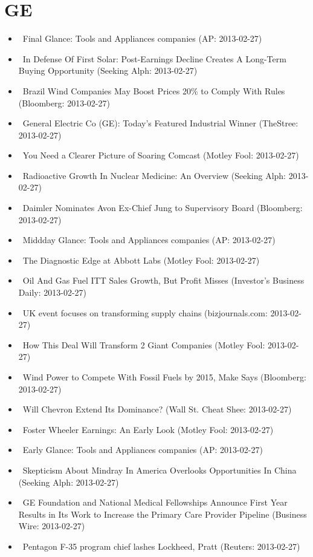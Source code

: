 \documentclass[11pt,asymmetric]{article}
\begin{document}
\section*{GE}
\begin{itemize}
\item\ Final Glance: Tools and Appliances companies (AP: 2013-02-27)
\item\ In Defense Of First Solar: Post-Earnings Decline Creates A Long-Term Buying Opportunity (Seeking Alph: 2013-02-27)
\item\ Brazil Wind Companies May Boost Prices 20\% to Comply With Rules (Bloomberg: 2013-02-27)
\item\ General Electric Co (GE): Today's Featured Industrial Winner (TheStree: 2013-02-27)
\item\ You Need a Clearer Picture of Soaring Comcast (Motley Fool: 2013-02-27)
\item\ Radioactive Growth In Nuclear Medicine: An Overview (Seeking Alph: 2013-02-27)
\item\ Daimler Nominates Avon Ex-Chief Jung to Supervisory Board (Bloomberg: 2013-02-27)
\item\ Middday Glance: Tools and Appliances companies (AP: 2013-02-27)
\item\ The Diagnostic Edge at Abbott Labs (Motley Fool: 2013-02-27)
\item\ Oil And Gas Fuel ITT Sales Growth, But Profit Misses (Investor's Business Daily: 2013-02-27)
\item\ UK event focuses on transforming supply chains (bizjournals.com: 2013-02-27)
\item\ How This Deal Will Transform 2 Giant Companies (Motley Fool: 2013-02-27)
\item\ Wind Power to Compete With Fossil Fuels by 2015, Make Says (Bloomberg: 2013-02-27)
\item\ Will Chevron Extend Its Dominance? (Wall St. Cheat Shee: 2013-02-27)
\item\ Foster Wheeler Earnings: An Early Look (Motley Fool: 2013-02-27)
\item\ Early Glance: Tools and Appliances companies (AP: 2013-02-27)
\item\ Skepticism About Mindray In America Overlooks Opportunities In China (Seeking Alph: 2013-02-27)
\item\ GE Foundation and National Medical Fellowships Announce First Year Results in Its Work to Increase the Primary Care Provider Pipeline (Business Wire: 2013-02-27)
\item\ Pentagon F-35 program chief lashes Lockheed, Pratt (Reuters: 2013-02-27)

\end{itemize}
\end{document}
